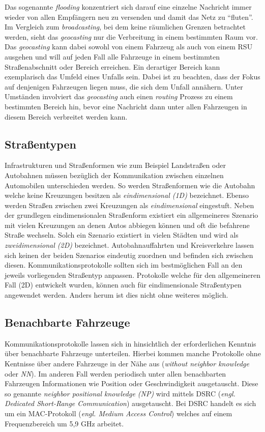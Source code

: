 \documentclass[english,runningheads,a4paper]{llncs}[2018/03/10]
\begin{document}
Das sogenannte \textit{flooding} konzentriert sich darauf eine einzelne Nachricht immer wieder von allen Empfängern neu zu versenden und damit das Netz zu ``fluten''.
Im Vergleich zum \textit{broadcasting}, bei dem keine räumlichen Grenzen betrachtet werden, sieht das \textit{geocasting} nur die Verbreitung in einem bestimmten Raum vor.
Das \textit{geocasting} kann dabei sowohl von einem Fahrzeug als auch von einem RSU ausgehen und will auf jeden Fall alle Fahrzeuge in einem bestimmten Straßenabschnitt oder Bereich erreichen.
Ein derartiger Bereich kann exemplarisch das Umfeld eines Unfalls sein.
Dabei ist zu beachten, dass der Fokus auf denjenigen Fahrzeugen liegen muss, die sich dem Unfall annähern.
Unter Umständen involviert das \textit{geocasting} auch einen \textit{routing} Prozess zu einem bestimmten Bereich hin, bevor eine Nachricht dann unter allen Fahrzeugen in diesem Bereich verbreitet werden kann.

\subsection{Straßentypen}
Infrastrukturen und Straßenformen wie zum Beispiel Landstraßen oder Autobahnen müssen bezüglich der Kommunikation zwischen einzelnen Automobilen unterschieden werden.
So werden Straßenformen wie die Autobahn welche keine Kreuzungen besitzen als \textit{eindimensional (1D)} bezeichnet.
Ebenso werden Straßen zwischen zwei Kreuzungen als \textit{eindimensional} eingestuft.
Neben der grundlegen eindimensionalen Straßenform existiert ein allgemeineres Szenario mit vielen Kreuzungen an denen Autos abbiegen können und oft die befahrene Straße wechseln.
Solch ein Szenario existiert in vielen Städten und wird als \textit{zweidimensional (2D)} bezeichnet.
Autobahnauffahrten und Kreisverkehre lassen sich keinen der beiden Szenarios eindeutig zuordnen und befinden sich zwischen diesen.
Kommunikationsprotokolle sollten sich im bestmöglichen Fall an den jeweils vorliegenden Straßentyp anpassen.
Protokolle welche für den allgemeineren Fall (2D) entwickelt wurden, können auch für eindimensionale Straßentypen angewendet werden.
Anders herum ist dies nicht ohne weiteres möglich.

\subsection{Benachbarte Fahrzeuge}
Kommunikationsprotokolle lassen sich in hinsichtlich der erforderlichen Kenntnis über benachbarte Fahrzeuge unterteilen.
Hierbei kommen manche Protokolle ohne Kentnisse über andere Fahrzeuge in der Nähe aus (\textit{without neighbor knowledge} oder \textit{NN}).
Im anderen Fall werden periodisch unter allen benachbarten Fahrzeugen Informationen wie Position oder Geschwindigkeit ausgetauscht.
Diese so genannte \textit{neighbor positional knowledge (NP)} wird mittels DSRC (\textit{engl. Dedicated Short-Range Communication}) ausgetauscht.
Bei DSRC handelt es sich um ein MAC-Protokoll (\textit{engl. Medium Access Control}) welches auf einem Frequenzbereich um 5,9 GHz arbeitet.
\end{document}
